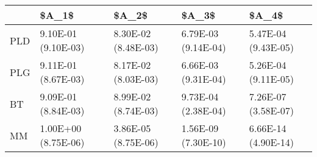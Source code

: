 \begin{tabular}{lllll}
\toprule
{} &                \$A\_1\$ &                \$A\_2\$ &                \$A\_3\$ &                \$A\_4\$ \\
\midrule
PLD &  9.10E-01 (9.10E-03) &  8.30E-02 (8.48E-03) &  6.79E-03 (9.14E-04) &  5.47E-04 (9.43E-05) \\
PLG &  9.11E-01 (8.67E-03) &  8.17E-02 (8.03E-03) &  6.66E-03 (9.31E-04) &  5.26E-04 (9.11E-05) \\
BT  &  9.09E-01 (8.84E-03) &  8.99E-02 (8.74E-03) &  9.73E-04 (2.38E-04) &  7.26E-07 (3.58E-07) \\
MM  &  1.00E+00 (8.75E-06) &  3.86E-05 (8.75E-06) &  1.56E-09 (7.30E-10) &  6.66E-14 (4.90E-14) \\
\bottomrule
\end{tabular}
